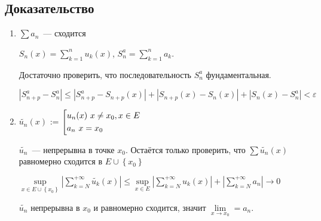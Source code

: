 \documentclass{article}
\begin{document}
        \subsection{Доказательство}
        
            \begin{enumerate}
            
                \item $\sum a_n$~--- сходится
                
                    $S_n(x) = \sum\limits^n_{k = 1} u_k(x)$, $S^a_n = \sum\limits^n_{k = 1} a_k$.
                    
                    Достаточно проверить, что последовательность $S^a_n$ фундаментальная.
                    
                    $\left| S^a_{n + p} - S^a_n \right| \leqslant \left| S^a_{n + p} - S_{n + p} (x) \right| + \left| S_{n + p}(x) - S_n(x) \right| + \left| S_n(x) - S^a_n \right| < \varepsilon$
                    
                \item 
                
                    $\widetilde{u_n}(x)$ := $\left[
                        \begin{gathered} 
                            u_n(x) \ x \neq x_0, x \in E 
                            \\ 
                            a_n \ x = x_0 \hfill
                        \end{gathered}
                        \right.$
                    
                    $\widetilde{u_n}$~--- непрерывна в точке $x_0$. Остаётся только проверить, что $\sum \widetilde{u_n}(x)$ равномерно сходится в $E \cup \left\{ x_0 \right\}$
                    
                    $\sup\limits_{x \in E \cup \left\{ x_0 \right\}} \left| \sum\limits^{+\infty}_{k = N} \widetilde{u_k}(x) \right| \leqslant \sup\limits_{x \in E} \left| \sum\limits^{+\infty}_{k = N} u_k(x) \right| + \left| \sum\limits_{k = N}^{+\infty} a_n \right| \rightarrow 0$
                    
                    $\widetilde{u_n}$ непрерывна в $x_0$ и равномерно сходится, значит $\lim\limits_{x \rightarrow x_0} = a_n$.
                    
            \end{enumerate}
        
    \newpage
    
\end{document}
